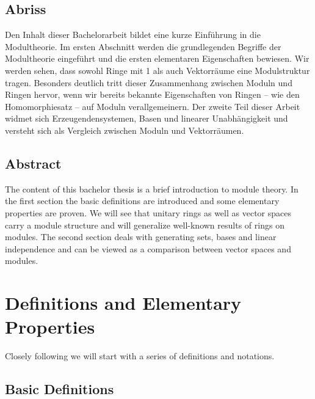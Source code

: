 \newpage

\thispagestyle{empty}

\begin{de}
\section*{Abriss}\sloppypar
Den Inhalt dieser Bachelorarbeit bildet eine kurze Einf\"uhrung in die Modultheorie. Im ersten Abschnitt werden die grundlegenden Begriffe der Modultheorie eingef\"uhrt und die ersten elementaren Eigenschaften bewiesen.
Wir werden sehen, dass sowohl Ringe mit 1 als auch Vektorr\"aume eine Modulstruktur tragen.
Besonders deutlich tritt dieser Zusammenhang zwischen Moduln und Ringen hervor, wenn wir bereits bekannte Ei\-gen\-schaf\-ten von Ringen -- wie den Homomorphiesatz -- auf Moduln verallgemeinern. Der zweite Teil dieser Arbeit widmet sich Er\-zeug\-en\-den\-sys\-tem\-en, Basen und linearer Unabh\"angigkeit und versteht sich als Vergleich zwischen Moduln und Vektorr\"aumen.
\end{de}
\vspace{1.5cm}
\section*{Abstract}
The content of this bachelor thesis is a brief introduction to module theory. In the first section the basic definitions are introduced and some elementary properties are proven. We will see that unitary rings as well as vector spaces carry a module structure and will generalize well-known results of rings on modules. The second section deals with generating sets, bases and linear independence and can be viewed as a comparison between vector spaces and modules.

\newpage
\chapter*{\contentsname}



\chapter{Definitions and Elementary Properties}

	Closely following \cite[Chap.~VII]{jantzen2005algebra} we will start with a series of definitions and notations.
	
	\section{Basic Definitions}
	
